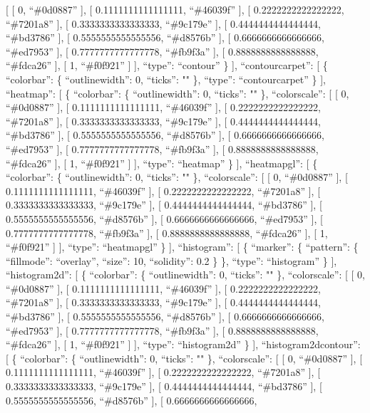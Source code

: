 \documentclass[
]{article}
\begin{document}
{[} {[} 0, ``\#0d0887'' {]}, {[} 0.1111111111111111, ``\#46039f'' {]},
{[} 0.2222222222222222, ``\#7201a8'' {]}, {[} 0.3333333333333333,
``\#9c179e'' {]}, {[} 0.4444444444444444, ``\#bd3786'' {]}, {[}
0.5555555555555556, ``\#d8576b'' {]}, {[} 0.6666666666666666,
``\#ed7953'' {]}, {[} 0.7777777777777778, ``\#fb9f3a'' {]}, {[}
0.8888888888888888, ``\#fdca26'' {]}, {[} 1, ``\#f0f921'' {]} {]},
``type'': ``contour'' \} {]}, ``contourcarpet'': {[} \{ ``colorbar'': \{
``outlinewidth'': 0, ``ticks'': "" \}, ``type'': ``contourcarpet'' \}
{]}, ``heatmap'': {[} \{ ``colorbar'': \{ ``outlinewidth'': 0,
``ticks'': "" \}, ``colorscale'': {[} {[} 0, ``\#0d0887'' {]}, {[}
0.1111111111111111, ``\#46039f'' {]}, {[} 0.2222222222222222,
``\#7201a8'' {]}, {[} 0.3333333333333333, ``\#9c179e'' {]}, {[}
0.4444444444444444, ``\#bd3786'' {]}, {[} 0.5555555555555556,
``\#d8576b'' {]}, {[} 0.6666666666666666, ``\#ed7953'' {]}, {[}
0.7777777777777778, ``\#fb9f3a'' {]}, {[} 0.8888888888888888,
``\#fdca26'' {]}, {[} 1, ``\#f0f921'' {]} {]}, ``type'': ``heatmap'' \}
{]}, ``heatmapgl'': {[} \{ ``colorbar'': \{ ``outlinewidth'': 0,
``ticks'': "" \}, ``colorscale'': {[} {[} 0, ``\#0d0887'' {]}, {[}
0.1111111111111111, ``\#46039f'' {]}, {[} 0.2222222222222222,
``\#7201a8'' {]}, {[} 0.3333333333333333, ``\#9c179e'' {]}, {[}
0.4444444444444444, ``\#bd3786'' {]}, {[} 0.5555555555555556,
``\#d8576b'' {]}, {[} 0.6666666666666666, ``\#ed7953'' {]}, {[}
0.7777777777777778, ``\#fb9f3a'' {]}, {[} 0.8888888888888888,
``\#fdca26'' {]}, {[} 1, ``\#f0f921'' {]} {]}, ``type'': ``heatmapgl''
\} {]}, ``histogram'': {[} \{ ``marker'': \{ ``pattern'': \{
``fillmode'': ``overlay'', ``size'': 10, ``solidity'': 0.2 \} \},
``type'': ``histogram'' \} {]}, ``histogram2d'': {[} \{ ``colorbar'': \{
``outlinewidth'': 0, ``ticks'': "" \}, ``colorscale'': {[} {[} 0,
``\#0d0887'' {]}, {[} 0.1111111111111111, ``\#46039f'' {]}, {[}
0.2222222222222222, ``\#7201a8'' {]}, {[} 0.3333333333333333,
``\#9c179e'' {]}, {[} 0.4444444444444444, ``\#bd3786'' {]}, {[}
0.5555555555555556, ``\#d8576b'' {]}, {[} 0.6666666666666666,
``\#ed7953'' {]}, {[} 0.7777777777777778, ``\#fb9f3a'' {]}, {[}
0.8888888888888888, ``\#fdca26'' {]}, {[} 1, ``\#f0f921'' {]} {]},
``type'': ``histogram2d'' \} {]}, ``histogram2dcontour'': {[} \{
``colorbar'': \{ ``outlinewidth'': 0, ``ticks'': "" \}, ``colorscale'':
{[} {[} 0, ``\#0d0887'' {]}, {[} 0.1111111111111111, ``\#46039f'' {]},
{[} 0.2222222222222222, ``\#7201a8'' {]}, {[} 0.3333333333333333,
``\#9c179e'' {]}, {[} 0.4444444444444444, ``\#bd3786'' {]}, {[}
0.5555555555555556, ``\#d8576b'' {]}, {[} 0.6666666666666666,
\end{document}
